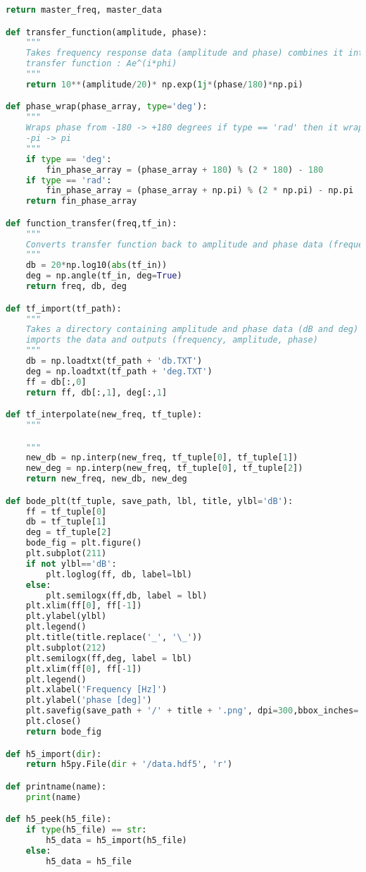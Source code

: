 \begin{lstlisting}[frame=single, language=Python]
    return master_freq, master_data

def transfer_function(amplitude, phase):
    """
    Takes frequency response data (amplitude and phase) combines it into a
    transfer function : Ae^(i*phi)
    """
    return 10**(amplitude/20)* np.exp(1j*(phase/180)*np.pi)

def phase_wrap(phase_array, type='deg'):
    """
    Wraps phase from -180 -> +180 degrees if type == 'rad' then it wraps from
    -pi -> pi
    """
    if type == 'deg':
        fin_phase_array = (phase_array + 180) % (2 * 180) - 180
    if type == 'rad':
        fin_phase_array = (phase_array + np.pi) % (2 * np.pi) - np.pi
    return fin_phase_array

def function_transfer(freq,tf_in):
    """
    Converts transfer function back to amplitude and phase data (frequency, amplitude [dB], phase [deg])
    """
    db = 20*np.log10(abs(tf_in))
    deg = np.angle(tf_in, deg=True)
    return freq, db, deg

def tf_import(tf_path):
    """
    Takes a directory containing amplitude and phase data (dB and deg) and
    imports the data and outputs (frequency, amplitude, phase)
    """
    db = np.loadtxt(tf_path + 'db.TXT')
    deg = np.loadtxt(tf_path + 'deg.TXT')
    ff = db[:,0]
    return ff, db[:,1], deg[:,1]

def tf_interpolate(new_freq, tf_tuple):
    """

    """
    new_db = np.interp(new_freq, tf_tuple[0], tf_tuple[1])
    new_deg = np.interp(new_freq, tf_tuple[0], tf_tuple[2])
    return new_freq, new_db, new_deg

def bode_plt(tf_tuple, save_path, lbl, title, ylbl='dB'):
    ff = tf_tuple[0]
    db = tf_tuple[1]
    deg = tf_tuple[2]
    bode_fig = plt.figure()
    plt.subplot(211)
    if not ylbl=='dB':
        plt.loglog(ff, db, label=lbl)
    else:
        plt.semilogx(ff,db, label = lbl)
    plt.xlim(ff[0], ff[-1])
    plt.ylabel(ylbl)
    plt.legend()
    plt.title(title.replace('_', '\_'))
    plt.subplot(212)
    plt.semilogx(ff,deg, label = lbl)
    plt.xlim(ff[0], ff[-1])
    plt.legend()
    plt.xlabel('Frequency [Hz]')
    plt.ylabel('phase [deg]')
    plt.savefig(save_path + '/' + title + '.png', dpi=300,bbox_inches='tight')
    plt.close()
    return bode_fig

def h5_import(dir):
    return h5py.File(dir + '/data.hdf5', 'r')

def printname(name):
    print(name)

def h5_peek(h5_file):
    if type(h5_file) == str:
        h5_data = h5_import(h5_file)
    else:
        h5_data = h5_file


\end{lstlisting}

